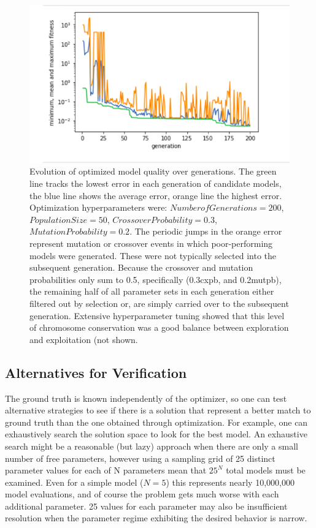 \begin{figure}
    \centering
    \includegraphics[scale=0.7]{figures/optimizer_internal_validation}
    \caption[Optimizer error over generations]{Evolution of optimized model quality over generations.
    The green line tracks the lowest error in each generation of candidate models, the blue line shows the average error, orange line the highest error.
    Optimization hyperparameters were: $Number of Generations=200$, $Population Size=50$, $Crossover Probability=0.3$, $Mutation Probability=0.2$.
    The periodic jumps in the orange error represent mutation or crossover events in which poor-performing models were generated.
    These were not typically selected into the subsequent generation.
    Because the crossover and mutation probabilities only sum to 0.5, specifically (0.3cxpb, and 0.2mutpb), the remaining half of all parameter sets in each generation either filtered out by selection or, are simply carried over to the subsequent generation.
    Extensive hyperparameter tuning showed that this level of chromosome conservation was a good balance between exploration and exploitation (not shown.}
    \label{fig:optimizer-evolution}
\end{figure}

\subsection{Alternatives for Verification}
The ground truth is known independently of the optimizer, so one can test alternative strategies to see if there is a solution that represent a better match to ground truth than the one obtained through optimization.
For example, one can exhaustively search the solution space to look for the best model.
An exhaustive search might be a reasonable (but lazy) approach when there are only a small number of free parameters, however using a sampling grid of 25 distinct parameter values for each of N parameters mean that $25^{N}$ total models must be examined.
Even for a simple model ($N=5$) this represents nearly 10,000,000 model evaluations, and of course the problem gets much worse with each additional parameter.
25 values for each parameter may also be insufficient resolution when the parameter regime exhibiting the desired behavior is narrow.

